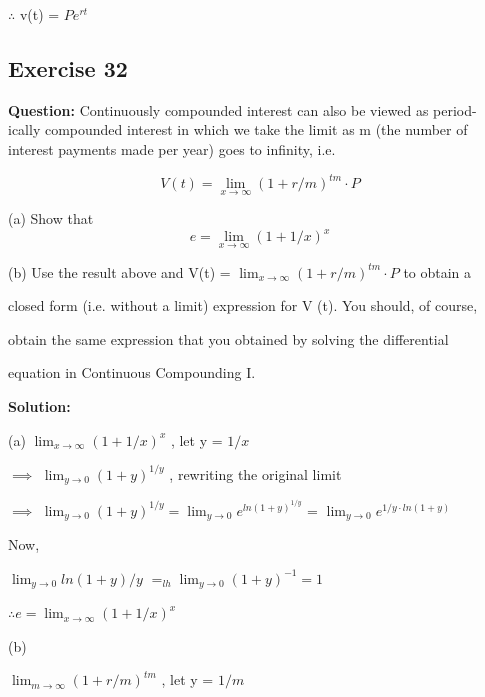 \documentclass{article}
\begin{document}
$\therefore$ v(t) = $Pe^{rt}$

\subsection*{Exercise 32}

\textbf{Question:} Continuously compounded interest can also be viewed as period-
ically compounded interest in which we take the limit as m (the number of interest payments made per year)
goes to infinity, i.e.

         \[ V(t) = \lim_{x\to\infty} (1 + r/m) ^ {tm} \cdot  P \]

(a) Show that
         \[ e = \lim_{x\to\infty} (1 + 1/x) ^ x \]

(b) Use the result above and V(t) = $\lim_{x\to\infty} (1 + r/m) ^ {tm} \cdot  P$ to obtain a 

closed form (i.e. without a limit) expression for V (t). You should, of course, 

obtain the same expression that you obtained by solving the differential

equation in Continuous Compounding I.



\textbf{Solution:}

(a)
$\lim_{x\to\infty} (1 + 1/x) ^ x$ , let y = $1/x$

\vspace{\baselineskip}

$\implies$ $\lim_{{y\to 0}} (1 + y) ^ {1/y}$ , rewriting the original limit 

\vspace{\baselineskip}

$\implies$ $\lim_{{y\to 0}} (1 + y) ^ {1/y} = \lim_{{y\to 0}} e^{ln(1+y) ^ {1/y}}$ = $\lim_{{y\to 0}} e^ {1/y \cdot {ln(1+y)}}$

\vspace{\baselineskip}

Now,

\vspace{\baselineskip}

$\lim_{{y\to 0}}  ln(1+y) / y$ $=_{lh} \lim_{{y\to 0}} (1 + y)^ {-1} = 1$

\vspace{\baselineskip}

$\therefore e = \lim_{x\to\infty} (1 + 1/x) ^ x$

(b)

$\lim_{m\to\infty} (1 + r/m) ^ {tm}$ , let y = $1/m$
\end{document}
